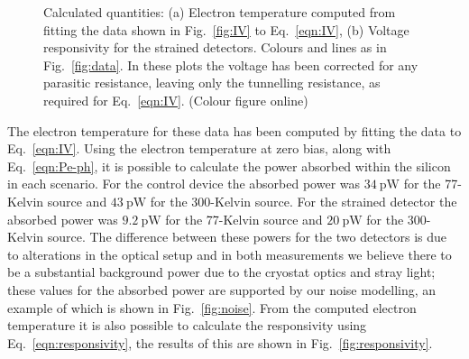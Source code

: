 \documentclass[final]{svjour2}
\begin{document}
\par 
\begin{figure}[htb]
\centering
{}
\caption{Calculated quantities: (a) Electron temperature computed from fitting the data shown in Fig.~\ref{fig:IV} to Eq.~\ref{eqn:IV}, (b) Voltage responsivity for the strained detectors. Colours and lines as in Fig.~\ref{fig:data}. In these plots the voltage has been corrected for any parasitic resistance, leaving only the tunnelling resistance, as required for Eq.~\ref{eqn:IV}. (Colour figure online)}
\end{figure}
The electron temperature for these data has been computed by fitting the data to Eq.~\ref{eqn:IV}. Using the electron temperature at zero bias, along with Eq.~\ref{eqn:Pe-ph}, it is possible to calculate the power absorbed within the silicon in each scenario. For the control device the absorbed power was $34~\mathrm{pW}$ for the 77-Kelvin source and $43~\mathrm{pW}$ for the 300-Kelvin source. For the strained detector the absorbed power was $9.2~\mathrm{pW}$ for the 77-Kelvin source and $20~\mathrm{pW}$ for the 300-Kelvin source. The difference between these powers for the two detectors is due to alterations in the optical setup and in both measurements we believe there to be a substantial background power due to the cryostat optics and stray light; these values for the absorbed power are supported by our noise modelling, an example of which is shown in Fig.~\ref{fig:noise}. From the computed electron temperature it is also possible to calculate the responsivity using Eq.~\ref{eqn:responsivity}, the results of this are shown in Fig.~\ref{fig:responsivity}.
\end{document}
